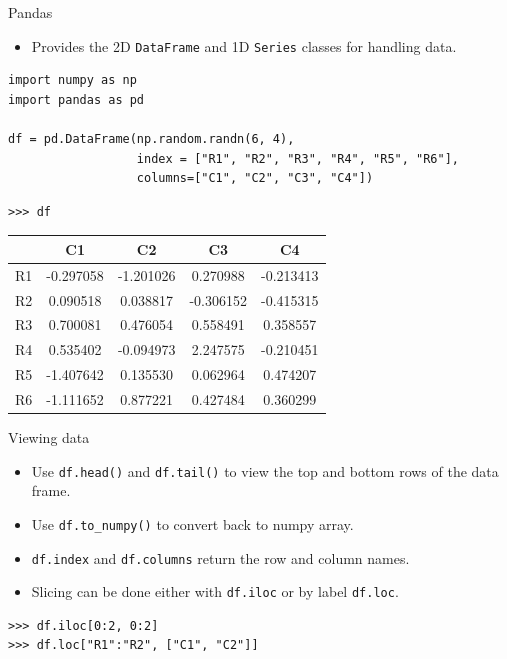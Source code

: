 \documentclass[compress%
,aspectratio=169%
]{beamer}
\newcommand{\code}{\lstinline}
\begin{document}
\begin{frame}[fragile]{Pandas}
\begin{itemize}
    \item Provides the 2D \code|DataFrame| and 1D \code|Series| classes for handling data.
\end{itemize}

\begin{lstlisting}
import numpy as np
import pandas as pd

df = pd.DataFrame(np.random.randn(6, 4), 
                  index = ["R1", "R2", "R3", "R4", "R5", "R6"],
                  columns=["C1", "C2", "C3", "C4"])

\end{lstlisting}
\begin{lstlisting}
>>> df
\end{lstlisting}
\begin{table}[]
\tiny
    \begin{tabular}{cSSSS}
\toprule
 & {C1}  &   {C2}  &   {C3}  & {C4} \\
\midrule
R1  &   -0.297058 &  -1.201026 &  0.270988  &  -0.213413 \\
R2  &   0.090518  &  0.038817  &  -0.306152 &  -0.415315 \\
R3  &  0.700081   &  0.476054  &  0.558491  &  0.358557 \\
R4  &  0.535402   & -0.094973  & 2.247575   & -0.210451 \\
R5  &   -1.407642 &  0.135530  & 0.062964   &  0.474207 \\
R6  &   -1.111652 &  0.877221  &  0.427484  &  0.360299 \\
\bottomrule
    \end{tabular}

\end{table}
\end{frame}

\begin{frame}[fragile]{Viewing data}

\begin{itemize}
    \item Use \code|df.head()| and \code|df.tail()| to view the top and bottom rows of the data frame.
    \item Use \lstinline{df.to_numpy()} to convert back to numpy array.
    \item \code|df.index| and \code{df.columns} return the row and column names.
    \item Slicing can be done either with \code{df.iloc} or by label \code{df.loc}.
\end{itemize}

\begin{lstlisting}
>>> df.iloc[0:2, 0:2]
>>> df.loc["R1":"R2", ["C1", "C2"]]
\end{lstlisting}

\end{frame}
\end{document}
